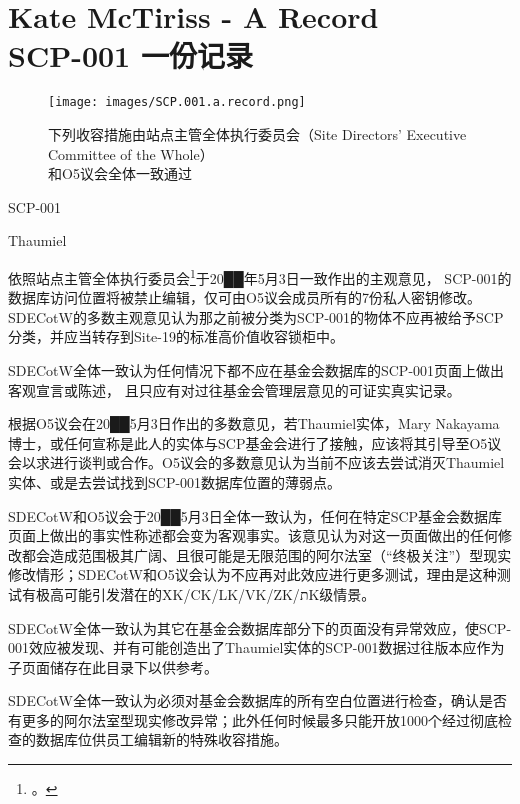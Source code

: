 \chapter[SCP-001 一份记录]{
	Kate McTiriss - A Record \\
	SCP-001 一份记录
}

\label{chap:SCP-001.a.record}

\begin{figure}[H]
	\centering
	\texttt{[image: images/SCP.001.a.record.png]}
	\caption*{下列收容措施由站点主管全体执行委员会（Site Directors' Executive Committee of the Whole）\\ 和O5议会全体一致通过}
\end{figure}

SCP-001

Thaumiel

依照站点主管全体执行委员会\footnote{。}于20██年5月3日一致作出的主观意见， SCP-001的数据库访问位置将被禁止编辑，仅可由O5议会成员所有的7份私人密钥修改。SDECotW的多数主观意见认为那之前被分类为SCP-001的物体不应再被给予SCP分类，并应当转存到Site-19的标准高价值收容锁柜中。

SDECotW全体一致认为任何情况下都不应在基金会数据库的SCP-001页面上做出客观宣言或陈述， 且只应有对过往基金会管理层意见的可证实真实记录。

根据O5议会在20██5月3日作出的多数意见，若Thaumiel实体，Mary Nakayama博士，或任何宣称是此人的实体与SCP基金会进行了接触，应该将其引导至O5议会以求进行谈判或合作。O5议会的多数意见认为当前不应该去尝试消灭Thaumiel实体、或是去尝试找到SCP-001数据库位置的薄弱点。

SDECotW和O5议会于20██5月3日全体一致认为，任何在特定SCP基金会数据库页面上做出的事实性称述都会变为客观事实。该意见认为对这一页面做出的任何修改都会造成范围极其广阔、且很可能是无限范围的阿尔法室（“终极关注”）型现实修改情形；SDECotW和O5议会认为不应再对此效应进行更多测试，理由是这种测试有极高可能引发潜在的XK/CK/LK/VK/ZK/תK级情景。

SDECotW全体一致认为其它在基金会数据库部分下的页面没有异常效应，使SCP-001效应被发现、并有可能创造出了Thaumiel实体的SCP-001数据过往版本应作为子页面储存在此目录下以供参考。

SDECotW全体一致认为必须对基金会数据库的所有空白位置进行检查，确认是否有更多的阿尔法室型现实修改异常；此外任何时候最多只能开放1000个经过彻底检查的数据库位供员工编辑新的特殊收容措施。

